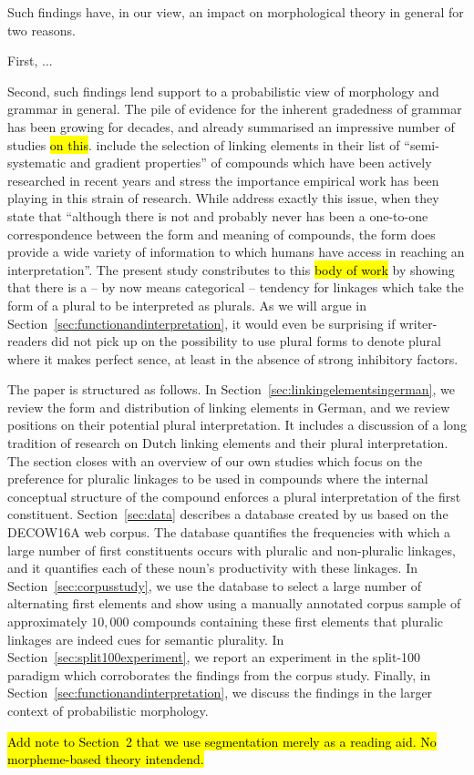 
Such findings have, in our view, an impact on morphological theory in general for two reasons.

First, ...


Second, such findings lend support to a probabilistic view of morphology and grammar in general.
The pile of evidence for the inherent gradedness of grammar has been growing for decades, and \textcite{HayBaayen2005} already summarised an impressive number of studies \hl{on this}.
\textcite[105]{ArndtlappeEa2016} include the selection of linking elements in their list of ``semi-systematic and gradient properties'' of compounds which have been actively researched in recent years and stress the importance empirical work has been playing in this strain of research.
While
\textcite[107]{ArndtlappeEa2016} address exactly this issue, when they state that ``although there is not and probably never has been a one-to-one correspondence between the form and meaning of compounds, the form does provide a wide variety of information to which humans have access in reaching an interpretation''.
The present study constributes to this \hl{body of work} by showing that there is a -- by now means categorical -- tendency for linkages which take the form of a plural to be interpreted as plurals.
As we will argue in Section~\ref{sec:functionandinterpretation}, it would even be surprising if writer-readers did not pick up on the possibility to use plural forms to denote plural where it makes perfect sence, at least in the absence of strong inhibitory factors.


The paper is structured as follows.
In Section~\ref{sec:linkingelementsingerman}, we review the form and distribution of linking elements in German, and we review positions on their potential plural interpretation.
It includes a discussion of a long tradition of research on Dutch linking elements and their plural interpretation.
The section closes with an overview of our own studies which focus on the preference for pluralic linkages to be used in compounds where the internal conceptual structure of the compound enforces a plural interpretation of the first constituent.
Section~\ref{sec:data} describes a database created by us based on the DECOW16A web corpus.
The database quantifies the frequencies with which a large number of first constituents occurs with pluralic and non-pluralic linkages, and it quantifies each of these noun's productivity with these linkages.
In Section~\ref{sec:corpusstudy}, we use the database to select a large number of alternating first elements and show using a manually annotated corpus sample of approximately $10,000$ compounds containing these first elements that pluralic linkages are indeed cues for semantic plurality.
In Section~\ref{sec:split100experiment}, we report an experiment in the split-100 paradigm which corroborates the findings from the corpus study.
Finally, in Section~\ref{sec:functionandinterpretation}, we discuss the findings in the larger context of probabilistic morphology.


\hl{Add note to Section~2 that we use segmentation merely as a reading aid. No morpheme-based theory intendend.}
